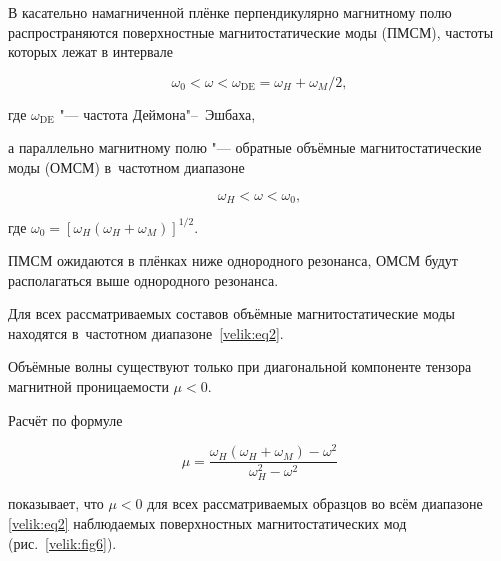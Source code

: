 В касательно намагниченной плёнке перпендикулярно магнитному полю распространяются поверхностные магнитостатические моды (ПМСМ), частоты которых лежат в интервале 

$$\omega_0<\omega< \omega_\text{DE} = \omega_H+\omega_M/2,$$ 

где $\omega_\text{DE}$ "--- частота Деймона"--~Эшбаха, 

а параллельно магнитному полю "--- обратные объёмные магнитостатические моды (ОМСМ) в~частотном диапазоне 

\begin{equation}

\omega_H<\omega<\omega_0,

\label{velik:eq2}

\end{equation}

где $\omega_0=[\omega_H(\omega_H+\omega_M)]^{1/2}$. 

ПМСМ ожидаются в плёнках ниже однородного резонанса, ОМСМ будут располагаться выше однородного резонанса. 

Для всех рассматриваемых составов объёмные магнитостатические моды находятся в~частотном диапазоне~\eqref{velik:eq2}. 

Объёмные волны существуют только при диагональной компоненте тензора магнитной проницаемости $\mu< 0$.

Расчёт по формуле \cite{velik:M12}

\begin{equation}

\mu=\frac{\omega_H(\omega_H+\omega_M)-\omega^2}{\omega_H^2-\omega^2}

\end{equation}

показывает, что $\mu< 0$  для всех рассматриваемых образцов во всём диапазоне \eqref{velik:eq2} наблюдаемых поверхностных магнитостатических мод (рис.~\ref{velik:fig6}).



